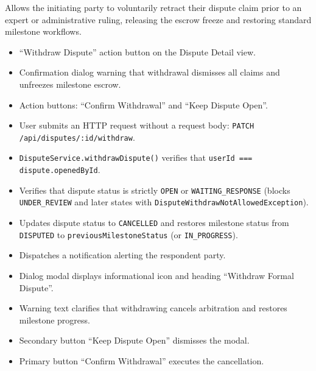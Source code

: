\noindent Allows the initiating party to voluntarily retract their dispute claim prior to an expert or administrative ruling, releasing the escrow freeze and restoring standard milestone workflows.

\begin{itemize}[leftmargin=1.6em,topsep=3pt,itemsep=2pt,parsep=0pt,label=$\bullet$]
      \item ``Withdraw Dispute'' action button on the Dispute Detail view.
      \item Confirmation dialog warning that withdrawal dismisses all claims and unfreezes milestone escrow.
      \item Action buttons: ``Confirm Withdrawal'' and ``Keep Dispute Open''.
\end{itemize}

\begin{itemize}[leftmargin=1.6em,topsep=3pt,itemsep=2pt,parsep=0pt,label=$\bullet$]
      \item User submits an HTTP request without a request body: \texttt{PATCH /\allowbreak{}api/\allowbreak{}disputes/\allowbreak{}:\allowbreak{}id/\allowbreak{}withdraw}.
      \item \texttt{DisputeService.withdrawDispute()} verifies that \texttt{userId === dispute.openedById}.
      \item Verifies that dispute status is strictly \texttt{OPEN} or \texttt{WAITING\_RESPONSE} (blocks \texttt{UNDER\_REVIEW} and later states with \texttt{DisputeWithdrawNotAllowedException}).
      \item Updates dispute status to \texttt{CANCELLED} and restores milestone status from \texttt{DISPUTED} to \texttt{previousMilestoneStatus} (or \texttt{IN\_PROGRESS}).
      \item Dispatches a notification alerting the respondent party.
\end{itemize}

\begin{itemize}[leftmargin=1.6em,topsep=3pt,itemsep=2pt,parsep=0pt,label=$\bullet$]
      \item Dialog modal displays informational icon and heading ``Withdraw Formal Dispute''.
      \item Warning text clarifies that withdrawing cancels arbitration and restores milestone progress.
      \item Secondary button ``Keep Dispute Open'' dismisses the modal.
      \item Primary button ``Confirm Withdrawal'' executes the cancellation.
\end{itemize}

